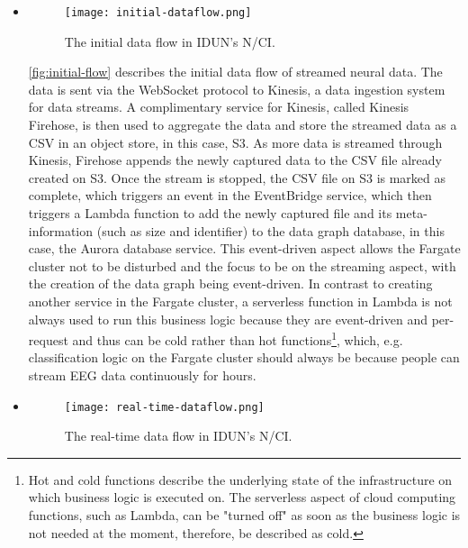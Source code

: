 \begin{itemize}
  \item  \begin{figure}[!ht]
          \centering
          \hspace*{0.4in}
          \texttt{[image: initial-dataflow.png]}
          \caption{The initial data flow in IDUN's N/CI.}
          \label{fig:initial-flow}
        \end{figure}

        \autoref{fig:initial-flow} describes the initial data flow of streamed neural data. The data is sent via the WebSocket protocol to Kinesis, a data ingestion system for data streams. A complimentary service for Kinesis, called Kinesis Firehose, is then used to aggregate the data and store the streamed data as a CSV in an object store, in this case, S3. As more data is streamed through Kinesis, Firehose appends the newly captured data to the CSV file already created on S3. Once the stream is stopped, the CSV file on S3 is marked as complete, which triggers an event in the EventBridge service, which then triggers a Lambda function to add the newly captured file and its meta-information (such as size and identifier) to the data graph database, in this case, the Aurora database service. This event-driven aspect allows the Fargate cluster not to be disturbed and the focus to be on the streaming aspect, with the creation of the data graph being event-driven. In contrast to creating another service in the Fargate cluster, a serverless function in Lambda is not always used to run this business logic because they are event-driven and per-request and thus can be cold rather than hot functions\footnote{Hot and cold functions describe the underlying state of the infrastructure on which business logic is executed on. The serverless aspect of cloud computing functions, such as Lambda, can be "turned off" as soon as the business logic is not needed at the moment, therefore, be described as cold.}, which, e.g. classification logic on the Fargate cluster should always be because people can stream EEG data continuously for hours.

  \item  \begin{figure}[!ht]
          \centering
          \hspace*{0.4in}
          \texttt{[image: real-time-dataflow.png]}
          \caption{The real-time data flow in IDUN's N/CI.}
          \label{fig:realtime-flow}
        \end{figure}


\end{itemize}
